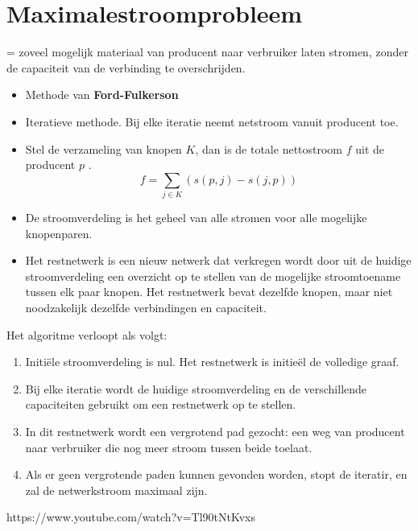 \documentclass{report}
\begin{document}
\section{Maximalestroomprobleem}
= zoveel mogelijk materiaal van producent naar verbruiker laten stromen, zonder de capaciteit van de verbinding te overschrijden.
\begin{itemize}
	\item [\info] Methode van \textbf{Ford-Fulkerson} 
	\item [\info] Iteratieve methode. Bij elke iteratie neemt netstroom vanuit producent toe.
	\item [\info] Stel de verzameling van knopen $K$, dan is de totale nettostroom $f$ uit de producent $p$ . 
		$$f = \sum_{j \in K} (s(p, j) - s(j, p))$$
	\item [\info] De stroomverdeling is het geheel van alle stromen voor alle mogelijke knopenparen. 
	\item [\info] Het restnetwerk is een nieuw netwerk dat verkregen wordt door uit de huidige stroomverdeling een overzicht op te stellen van de mogelijke stroomtoename tussen elk paar knopen. Het restnetwerk bevat dezelfde knopen, maar niet noodzakelijk dezelfde verbindingen en capaciteit.
\end{itemize}
Het algoritme verloopt als volgt:
\begin{enumerate}
	\item Initiële stroomverdeling is nul. Het restnetwerk is initieël de volledige graaf.
	\item Bij elke iteratie wordt de huidige stroomverdeling en de verschillende capaciteiten gebruikt om een restnetwerk op te stellen.
	\item In dit restnetwerk wordt een vergrotend pad gezocht: een weg van producent naar verbruiker die nog meer stroom tussen beide toelaat.
	\item Als er geen vergrotende paden kunnen gevonden worden, stopt de iteratir, en zal de netwerkstroom maximaal zijn.
\end{enumerate}
https://www.youtube.com/watch?v=Tl90tNtKvxs
\end{document}
